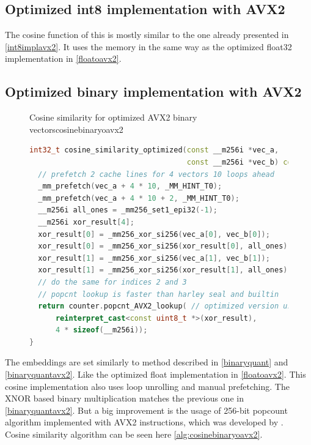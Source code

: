 \subsection{Optimized int8 implementation with AVX2}
\label{sec:optint8avx2}
The cosine function of this is mostly similar to the one already presented in \autoref{int8implavx2}. It uses the memory in the same way as the optimized float32 implementation in \autoref{floatoavx2}.
\subsection{Optimized binary implementation with AVX2}
\label{sec:optbinaryavx2}
\begin{figure}[h]
    \begin{algorithm}{Cosine similarity for optimized AVX2 binary vectors}{cosinebinaryoavx2}
        \begin{lstlisting}[language=C++]
int32_t cosine_similarity_optimized(const __m256i *vec_a,
                                    const __m256i *vec_b) const {
  // prefetch 2 cache lines for 4 vectors 10 loops ahead
  _mm_prefetch(vec_a + 4 * 10, _MM_HINT_T0);
  _mm_prefetch(vec_a + 4 * 10 + 2, _MM_HINT_T0);
  __m256i all_ones = _mm256_set1_epi32(-1);
  __m256i xor_result[4];
  xor_result[0] = _mm256_xor_si256(vec_a[0], vec_b[0]);      // XOR
  xor_result[0] = _mm256_xor_si256(xor_result[0], all_ones); // NOT
  xor_result[1] = _mm256_xor_si256(vec_a[1], vec_b[1]);      // XOR
  xor_result[1] = _mm256_xor_si256(xor_result[1], all_ones); // NOT
  // do the same for indices 2 and 3
  // popcnt lookup is faster than harley seal and builtin
  return counter.popcnt_AVX2_lookup( // optimized version using AVX2
      reinterpret_cast<const uint8_t *>(xor_result),
      4 * sizeof(__m256i));
}
    \end{lstlisting}
    \end{algorithm}
\end{figure}
\noindent The embeddings are set similarly to method described in \autoref{binaryquant} and \autoref{binaryquantavx2}. Like the optimized float implementation in \autoref{floatoavx2}. This cosine implementation also uses loop unrolling and manual prefetching. The XNOR based binary multiplication matches the previous one in \autoref{binaryquantavx2}. But a big improvement is the usage of 256-bit popcount algorithm implemented with AVX2 instructions, which was developed by \citeauthor{Mu_a_2017}.~\cite{Mu_a_2017} Cosine similarity algorithm can be seen here \autoref{alg:cosinebinaryoavx2}.

